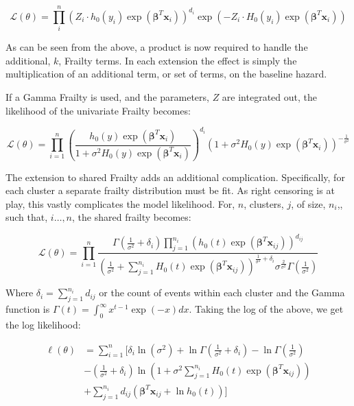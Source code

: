 $$ \mathcal {L}(\theta) = \prod^n_i \left (Z_i \cdot h_0(y_i) \exp(\boldsymbol\beta^T \textbf{x}_i)  \right )^{d_i} \exp(-Z_i \cdot H_0(y_i) \exp(\boldsymbol\beta^T \textbf{x}_i)) $$

As can be seen from the above, a product is now required to handle the additional, $k$, Frailty terms. In each extension the effect is simply the multiplication of an additional term, or set of terms, on the baseline hazard.

If a Gamma Frailty is used, and the parameters, $Z$ are integrated out, the likelihood of the univariate Frailty becomes: 

$$ \mathcal {L}(\theta) = \prod_{i=1}^n \left (\frac{h_0(y) \exp(\boldsymbol\beta^T \textbf{x}_i)}{1+ \sigma^2 H_0(y) \exp(\boldsymbol\beta^T \textbf{x}_i)}  \right )^{d_i} (1+ \sigma^2 H_0(y) \exp(\boldsymbol\beta^T \textbf{x}_i))^{-\frac{1}{\sigma^2}} $$

The extension to shared Frailty adds an additional complication. Specifically, for each cluster a separate frailty distribution must be fit. As right censoring is at play, this vastly complicates the model likelihood. For, $n$, clusters, $j$, of size, $n_i$,, such that, $i \dots, n$, the shared frailty becomes\cite{Wienke2010}:

$$ \mathcal {L}(\theta) =\prod_{i=1}^n \frac{\Gamma(\frac{1}{\sigma^2} + \delta_i) \prod^{n_i}_{j=1} (h_0(t) \exp(\boldsymbol\beta^T \textbf{x}_{ij}))^{d_{ij}} }{(\frac{1}{\sigma^2} + \sum_{j =1}^{n_i} H_0(t) \exp(\boldsymbol\beta^T \textbf{x}_{ij}))^{\frac{1}{\sigma^2} + \delta_i} \sigma^{\frac{2}{\sigma^2}} \Gamma(\frac{1}{\sigma^2})} $$

Where $\delta_i = \sum^{n_i}_{j=1} d_{ij}$ or the count of events within each cluster and the Gamma function is $\Gamma (t) = \int _{0}^{\infty }x^{t-1}\exp(-x)dx$. Taking the log of the above, we get the log likelihood\cite{Duchateau2008}:

\begin{align*}
\ell(\theta)& = \sum^n_{i=1}  \Bigg[\delta_i \ln(\sigma^2) + \ln \Gamma\left (\frac{1}{\sigma^2} + \delta_i  \right )  - \ln\Gamma\left (\frac{1}{\sigma^2}  \right )\\
& - \left (\frac{1}{\sigma^2} + \delta_i  \right ) \ln \left (1 + \sigma^2 \sum_{j=1}^{n_i} H_0(t)\exp(\boldsymbol\beta^T \textbf{x}_{ij})  \right )\\
& + \sum_{j=1}^{n_i} d_{ij} \left (\boldsymbol\beta^T \textbf{x}_{ij} + \ln h_0(t) \right )  \Bigg]
\end{align*}

